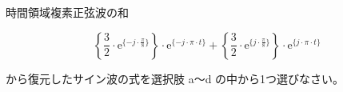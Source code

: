 時間領域複素正弦波の和

\[
\left \{ \frac{3}{2} \cdot \textrm{e}^{\{-j \cdot \frac{\pi}{8} \}} \right \} \cdot \textrm{e}^{\{-j \cdot \pi \cdot t \}} +  
\left \{ \frac{3}{2} \cdot \textrm{e}^{\{ j \cdot \frac{\pi}{8} \}} \right \} \cdot \textrm{e}^{\{ j \cdot \pi \cdot t \}}
\]

\bigskip
\noindent から復元したサイン波の式を選択肢 a〜d の中から1つ選びなさい。
